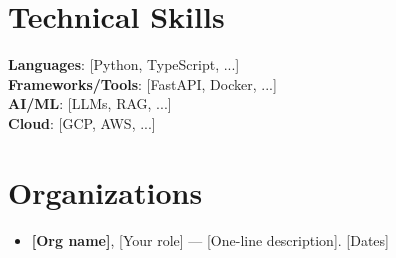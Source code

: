 \documentclass[letterpaper,11pt]{article}
\newcommand{\resumeItem}[1]{
  \item\small{
    {#1 \vspace{0pt}}
  }
}
\newcommand{\resumeSubHeadingListStart}{\begin{itemize}[leftmargin=0.15in, label={}]}
\newcommand{\resumeSubHeadingListEnd}{\end{itemize}}
\begin{document}
\section{Technical Skills}
  \begin{itemize}[leftmargin=0.0in, label={}]
    \small{\item{
      \textbf{Languages}: [Python, TypeScript, ...] \\
      \textbf{Frameworks/Tools}: [FastAPI, Docker, ...] \\
      \textbf{AI/ML}: [LLMs, RAG, ...] \\
      \textbf{Cloud}: [GCP, AWS, ...]
    }}
  \end{itemize}

\section{Organizations}
  \resumeSubHeadingListStart
    \resumeItem{\textbf{[Org name]}, [Your role] --- [One-line description]. \hfill [Dates]}
  \resumeSubHeadingListEnd

\end{document}
